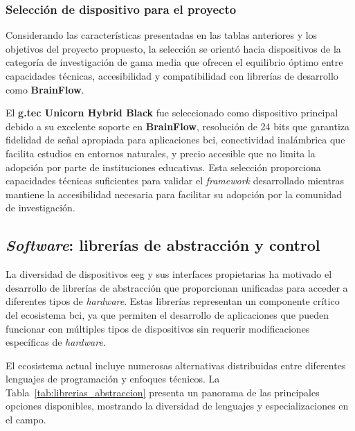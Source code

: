 \subsubsection{Selección de dispositivo para el proyecto}
\label{subsubsec:seleccion_dispositivo}

Considerando las características presentadas en las tablas anteriores y los objetivos del proyecto propuesto, la selección se orientó hacia dispositivos de la categoría de investigación de gama media que ofrecen el equilibrio óptimo entre capacidades técnicas, accesibilidad y compatibilidad con librerías de desarrollo como \textbf{BrainFlow}.

El \textbf{g.tec Unicorn Hybrid Black} fue seleccionado como dispositivo principal debido a su excelente soporte en \textbf{BrainFlow}, resolución de 24 bits que garantiza fidelidad de señal apropiada para aplicaciones \acrshort{bci}, conectividad inalámbrica que facilita estudios en entornos naturales, y precio accesible que no limita la adopción por parte de instituciones educativas. Esta selección proporciona capacidades técnicas suficientes para validar el \textit{\gls{framework}} desarrollado mientras mantiene la accesibilidad necesaria para facilitar su adopción por la comunidad de investigación.

\subsection{\textit{Software}: librerías de abstracción y control}
\label{subsec:software_librerias}

La diversidad de dispositivos \acrshort{eeg} y sus interfaces propietarias ha motivado el desarrollo de librerías de abstracción que proporcionan  unificadas para acceder a diferentes tipos de \textit{hardware}. Estas librerías representan un componente crítico del ecosistema \acrshort{bci}, ya que permiten el desarrollo de aplicaciones que pueden funcionar con múltiples tipos de dispositivos sin requerir modificaciones específicas de \textit{hardware}. 

El ecosistema actual incluye numerosas alternativas distribuidas entre diferentes lenguajes de programación y enfoques técnicos. La Tabla~\ref{tab:librerias_abstraccion} presenta un panorama de las principales opciones disponibles, mostrando la diversidad de lenguajes y especializaciones en el campo.

